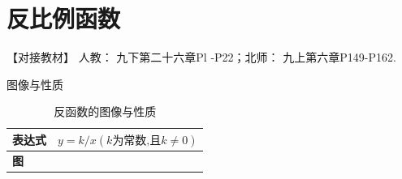 \documentclass[cn,blue,12pt]{elegantbook}
\begin{document}
\chapter{反比例函数}%
\label{cha:反比例函数}
\begin{note}
    【对接教材】 人教： 九下第二十六章Pl -P22；北师： 九上第六章P149-P162.
\end{note}
\begin{zsyd}
\item 图像与性质
    \begin{table}[H]
        \centering
        \caption{反函数的图像与性质}
        \begin{tabular}{|p{5em}|c|c|}
            \hline
            \textbf{表达式} & \multicolumn{2}{c|}{\(y=k/x(k\text{为常数,且}k \ne 0)\)} \bigstrut\\
            \hline
            \textbf{图} & \multicolumn{1}{l|}{} & \multicolumn{1}{l|}{} \bigstrut\\


\end{tabular}
\end{table}
\end{zsyd}
\end{document}
